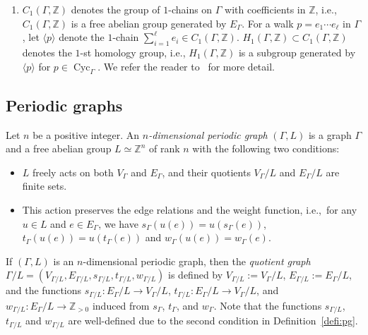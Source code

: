 \documentclass[11pt]{article}
\theoremstyle{definition}
\numberwithin{equation}{section}
\begin{document}
\begin{defn}
\begin{enumerate}
\item 
$C_1(\Gamma, \mathbb{Z})$ denotes the group of $1$-chains on $\Gamma$ with coefficients in $\mathbb{Z}$, i.e., 
$C_1(\Gamma, \mathbb{Z})$ is a free abelian group generated by $E_{\Gamma}$. 
For a walk $p = e_1 \cdots e_{\ell}$ in $\Gamma$, let $\langle p \rangle$ denote the $1$-chain 
$\sum _{i = 1} ^{\ell} e_i \in C_1(\Gamma, \mathbb{Z})$. 
$H_1(\Gamma, \mathbb{Z}) \subset C_1(\Gamma, \mathbb{Z})$ denotes the $1$-st homology group, i.e., 
$H_1(\Gamma, \mathbb{Z})$ is a subgroup generated by $\langle p \rangle$ for $p \in \operatorname{Cyc}_{\Gamma}$. 
We refer the reader to~\cite{Sunada} for more detail. 
\end{enumerate}
\end{defn}

\subsection{Periodic graphs}

\begin{defn}\label{defi:pg}
Let $n$ be a positive integer. 
An \textit{$n$-dimensional periodic graph} $(\Gamma, L)$ is a graph $\Gamma$ and 
a free abelian group $L \simeq \mathbb{Z}^n$ of rank $n$ with the following two conditions:
\begin{itemize}
\item $L$ freely acts on both $V_\Gamma$ and $E_\Gamma$, 
and their quotients $V_\Gamma / L$ and $E_\Gamma / L$ are finite sets. 
\item This action preserves the edge relations and the weight function, i.e.,\ for any $u \in L$ and $e \in E_\Gamma$, 
we have $s_\Gamma(u(e))=u(s_\Gamma(e))$, $t_\Gamma(u(e))=u(t_\Gamma(e))$ and 
$w_{\Gamma}(u(e))=w_{\Gamma}(e)$.
\end{itemize}
\end{defn}

If $(\Gamma, L)$ is an $n$-dimensional periodic graph, 
then the \textit{quotient graph} $\Gamma /L = (V_{\Gamma/L}, E_{\Gamma/L}, s_{\Gamma/L},t_{\Gamma/L},w_{\Gamma/L})$ is defined by 
$V_{\Gamma/L} := V_{\Gamma} /L$, $E_{\Gamma/L} := E_{\Gamma} /L$, 
and the functions $s_{\Gamma/L}: E_\Gamma/L \to V_\Gamma/L$, 
$t_{\Gamma/L}: E_\Gamma/L \to V_\Gamma/L$, and 
$w_{\Gamma/L}: E_\Gamma/L \to \mathbb{Z}_{>0}$ induced from $s_{\Gamma}$, $t_{\Gamma}$, and $w_{\Gamma}$. 
Note that the functions $s_{\Gamma/L}$, $t_{\Gamma/L}$ and $w_{\Gamma/L}$ 
are well-defined due to the second condition in Definition~\ref{defi:pg}.
\end{document}
